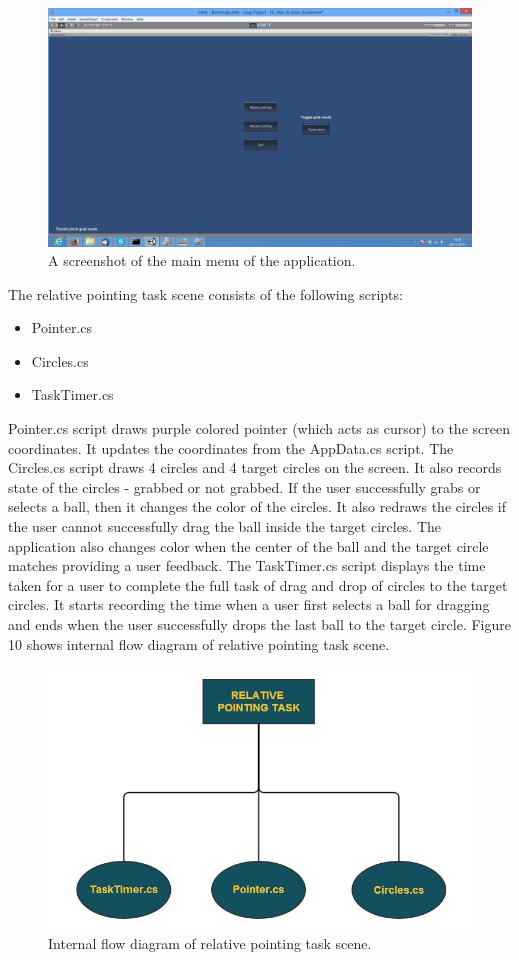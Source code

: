 \documentclass[titlepage]{article}
\begin{document}
\begin{figure}[!h]
\centering
\includegraphics[width=7.0in]{Figure_8}
\caption{A screenshot of the main menu of the application.}
\end{figure}

The relative pointing task scene consists of the following scripts:

\begin{itemize}
    \item Pointer.cs
    \item Circles.cs
    \item TaskTimer.cs
\end{itemize}

Pointer.cs script draws purple colored pointer (which acts as cursor) to the screen coordinates. It updates the coordinates from the AppData.cs script. The Circles.cs script draws 4 circles and 4 target circles on the screen. It also records state of the circles - grabbed or not grabbed. If the user successfully grabs or selects a ball, then it changes the color of the circles. It also redraws the circles if the user cannot successfully drag the ball inside the target circles. The application also changes color when the center of the ball and the target circle matches providing a user feedback. The TaskTimer.cs script displays the time taken for a user to complete the full task of drag and drop of circles to the target circles. It starts recording the time when a user first selects a ball for dragging and ends when the user successfully drops the last ball to the target circle. Figure 10 shows internal flow diagram of relative pointing task scene. 

\begin{figure}[!h]
    \centering
    \includegraphics[width=4.5in]{Figure_9}
    \caption{Internal flow diagram of relative pointing task scene.}
\end{figure}
 
\end{document}
